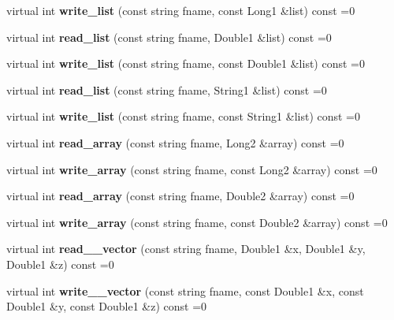 \begin{DoxyCompactItemize}
\item 
\mbox{\label{structIo_a88b9ed3d29a39626f53c5204757603d3}} 
virtual int {\bfseries write\+\_\+list} (const string fname, const Long1 \&list) const =0
\item 
\mbox{\label{structIo_aa1d905d1469000f40bfa03dfeca0de73}} 
virtual int {\bfseries read\+\_\+list} (const string fname, Double1 \&list) const =0
\item 
\mbox{\label{structIo_ab0789472bdbe4f0b18e8497fe5773c45}} 
virtual int {\bfseries write\+\_\+list} (const string fname, const Double1 \&list) const =0
\item 
\mbox{\label{structIo_a292ce8e28c5c835354be4a5870aef70a}} 
virtual int {\bfseries read\+\_\+list} (const string fname, String1 \&list) const =0
\item 
\mbox{\label{structIo_a9a0f1f37f414d4f8480878aef4a7a859}} 
virtual int {\bfseries write\+\_\+list} (const string fname, const String1 \&list) const =0
\item 
\mbox{\label{structIo_af6cacc007e010a226459b37ba976aa18}} 
virtual int {\bfseries read\+\_\+array} (const string fname, Long2 \&array) const =0
\item 
\mbox{\label{structIo_aa73fe79d27fbaf31cbea124769e13a2e}} 
virtual int {\bfseries write\+\_\+array} (const string fname, const Long2 \&array) const =0
\item 
\mbox{\label{structIo_a4b1c5f54037a18b97c47c2fc35bbfb1d}} 
virtual int {\bfseries read\+\_\+array} (const string fname, Double2 \&array) const =0
\item 
\mbox{\label{structIo_af2f52ba6b21d23af0b3bed255e815c5b}} 
virtual int {\bfseries write\+\_\+array} (const string fname, const Double2 \&array) const =0
\item 
\mbox{\label{structIo_aef5a70d68049574861ebbd40aea9b293}} 
virtual int {\bfseries read\+\_\+\_\+vector} (const string fname, Double1 \&x, Double1 \&y, Double1 \&z) const =0
\item 
\mbox{\label{structIo_a175931043244e44f87641ea7c5c7aeff}} 
virtual int {\bfseries write\+\_\+\_\+vector} (const string fname, const Double1 \&x, const Double1 \&y, const Double1 \&z) const =0
\end{DoxyCompactItemize}
